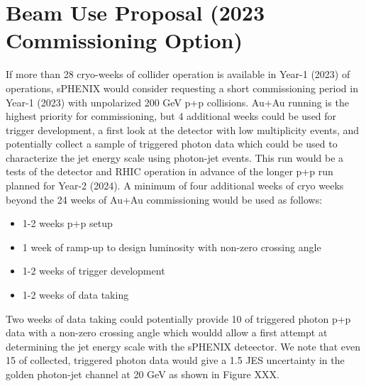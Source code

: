 \chapter{Beam Use Proposal (2023 \pp Commissioning Option)}
\label{chap:year1pp}

If more than 28 cryo-weeks of collider operation is available in Year-1 (2023) of operations, sPHENIX would consider
requesting a short commissioning period in Year-1 (2023) with unpolarized 200 GeV p+p collisions.
Au+Au running is the highest priority for commissioning, but 4 additional 
weeks could be used for trigger development, a first look at the detector with
low multiplicity events, and potentially collect a sample of triggered photon
data which could be used to characterize the jet energy scale using photon-jet
events.
This run would be a tests of the detector and RHIC operation in advance of
the longer p+p run planned for Year-2 (2024). 
A minimum of four additional weeks of cryo weeks beyond the 24 weeks of Au+Au
commissioning would be used as follows:

\begin{itemize}

\item 1-2 weeks p+p setup
\item 1 week of ramp-up to design luminosity with non-zero crossing
angle
\item 1-2 weeks of trigger development
\item 1-2 weeks of data taking

\end{itemize}

Two weeks of data taking could potentially provide 10 \pb of triggered photon
p+p data with a non-zero crossing angle which wouldd allow a first attempt 
at determining the jet energy scale with the sPHENIX deteector.
We note that even 15 \pb of collected, triggered photon data would give a 1.5%
JES uncertainty in the golden photon-jet channel at 20 GeV as shown in Figure XXX.